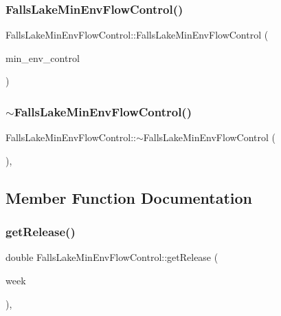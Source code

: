 \subsubsection{\texorpdfstring{Falls\+Lake\+Min\+Env\+Flow\+Control()}{FallsLakeMinEnvFlowControl()}\hspace{0.1cm}{\footnotesize\ttfamily [2/2]}}
{\footnotesize\ttfamily Falls\+Lake\+Min\+Env\+Flow\+Control\+::\+Falls\+Lake\+Min\+Env\+Flow\+Control (\begin{DoxyParamCaption}\item[{const \mbox{\hyperlink{classFallsLakeMinEnvFlowControl}{Falls\+Lake\+Min\+Env\+Flow\+Control}} \&}]{min\+\_\+env\+\_\+control }\end{DoxyParamCaption})}

\mbox{\label{classFallsLakeMinEnvFlowControl_a747aefedd1e590007206ef08145be351}} 
\subsubsection{\texorpdfstring{$\sim$\+Falls\+Lake\+Min\+Env\+Flow\+Control()}{~FallsLakeMinEnvFlowControl()}}
{\footnotesize\ttfamily Falls\+Lake\+Min\+Env\+Flow\+Control\+::$\sim$\+Falls\+Lake\+Min\+Env\+Flow\+Control (\begin{DoxyParamCaption}{ }\end{DoxyParamCaption})\hspace{0.3cm}{\ttfamily [override]}, {\ttfamily [default]}}



\subsection{Member Function Documentation}
\mbox{\label{classFallsLakeMinEnvFlowControl_a50453b443fb6e5869fcfc9a183f42b2f}} 
\subsubsection{\texorpdfstring{get\+Release()}{getRelease()}}
{\footnotesize\ttfamily double Falls\+Lake\+Min\+Env\+Flow\+Control\+::get\+Release (\begin{DoxyParamCaption}\item[{int}]{week }\end{DoxyParamCaption})\hspace{0.3cm}{\ttfamily [override]}, {\ttfamily [virtual]}}



